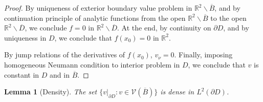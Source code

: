 \documentclass[10pt, a4paper, twoside, openright]{book}
\theoremstyle{definition}
\theoremstyle{plain}
\theoremstyle{plain}
\theoremstyle{plain}
\theoremstyle{plain}
\theoremstyle{plain}
\newtheorem{lemma}[subsection]{Lemma}
\theoremstyle{plain}
\theoremstyle{plain}
\theoremstyle{plain}
\begin{document}
\begin{proof}
 \par
 By uniqueness of exterior boundary value problem in $\mathbb{R}^2\backslash\overline{B}$, and by continuation 
 principle of analytic functions from the open $\mathbb{R}^2\backslash\overline{B}$ to the 
 open $\mathbb{R}^2\backslash\overline{D}$, we conclude $f=0$ in $\mathbb{R}^2\backslash\overline{D}$.
 At the end, by continuity on $\partial D$, and by uniqueness in $D$, we conclude that $f(x_0)=0$ in $\mathbb{R}^2$.
 \par
 By jump relations of the derivatives of $f(x_0)$, $v_\nu = 0$. Finally, imposing homogeneous Neumann condition to interior problem in $D$, 
 we conclude that $v$ is constant in $D$ and in $\overline{B}$.
\end{proof}

\begin{lemma}[Density]
\label{lemma:density-V-0}
 The set $\{v|_{\partial D}: v\in \mathcal{V}(\overline{B})\}$ is dense in $L^2(\partial D)$.
\end{lemma}
\end{document}
